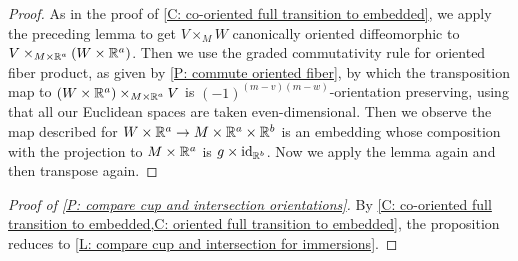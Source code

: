 \begin{proof}
	As in the proof of \cref{C: co-oriented full transition to embedded},
	we apply the preceding lemma to get $V \times_M W$ canonically oriented diffeomorphic to $V\times_{M \times \mathbb{R}^a }(W \times \mathbb{R}^a )$.
	Then we use the graded commutativity rule for oriented fiber product, as given by \cref{P: commute oriented fiber},
	by which
	the transposition map to $(W \times \mathbb{R}^a )\times_{M \times \mathbb{R}^a }V$ is $(-1)^{(m-v)(m-w)}$-orientation preserving, using that all our Euclidean spaces are taken even-dimensional.
	Then we observe the map described for $W \times \mathbb{R}^a \to M \times \mathbb{R}^a \times \mathbb{R}^b $ is an embedding whose composition with the projection to $M \times \mathbb{R}^a $ is $g \times \mathrm{id}_{\mathbb{R}^b }$.
	Now we apply the lemma again and then transpose again.
\end{proof}

\begin{proof}[Proof of \cref{P: compare cup and intersection orientations}]
	By \cref{C: co-oriented full transition to embedded,C: oriented full transition to embedded}, the proposition reduces to \cref{L: compare cup and intersection for immersions}.
\end{proof}

